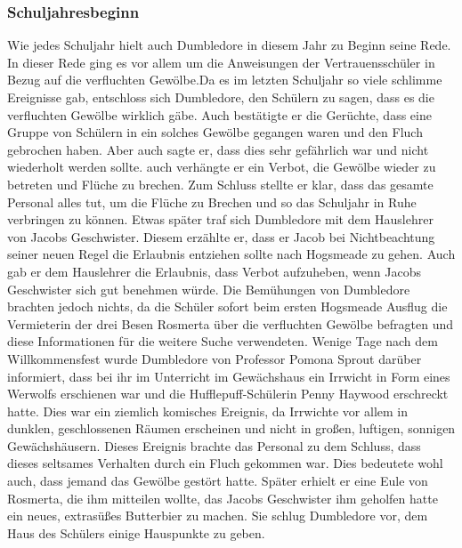 \documentclass[a4paper, 10pt]{article}
\begin{document}
\subsubsection*{Schuljahresbeginn}
Wie jedes Schuljahr hielt auch Dumbledore in diesem Jahr zu Beginn seine Rede. In dieser Rede ging es vor allem um die Anweisungen der Vertrauensschüler in Bezug auf die verfluchten Gewölbe.Da es im letzten Schuljahr so viele schlimme Ereignisse gab, entschloss sich Dumbledore, den Schülern zu sagen, dass es die verfluchten Gewölbe wirklich gäbe. Auch bestätigte er die Gerüchte, dass eine Gruppe von Schülern in ein solches Gewölbe gegangen waren und den Fluch gebrochen haben. Aber auch sagte er, dass dies sehr gefährlich war und nicht wiederholt werden sollte. auch verhängte er ein Verbot, die Gewölbe wieder zu betreten und Flüche zu brechen. Zum Schluss stellte er klar, dass das gesamte Personal alles tut, um die Flüche zu Brechen und so das Schuljahr in Ruhe verbringen zu können.
\vspace{10pt}
\newline
Etwas später traf sich Dumbledore mit dem Hauslehrer von Jacobs Geschwister. Diesem erzählte er, dass er Jacob bei Nichtbeachtung seiner neuen Regel die Erlaubnis entziehen sollte nach Hogsmeade zu gehen. Auch gab er dem Hauslehrer die Erlaubnis, dass Verbot aufzuheben, wenn Jacobs Geschwister sich gut benehmen würde. Die Bemühungen von Dumbledore brachten jedoch nichts, da die Schüler sofort beim ersten Hogsmeade Ausflug die Vermieterin der drei Besen Rosmerta über die verfluchten Gewölbe befragten und diese Informationen für die weitere Suche verwendeten.
\vspace{10pt}
\newline
Wenige Tage nach dem Willkommensfest wurde Dumbledore von Professor Pomona Sprout darüber informiert, dass bei ihr im Unterricht im Gewächshaus ein Irrwicht in Form eines Werwolfs erschienen war und die Hufflepuff-Schülerin Penny Haywood erschreckt hatte. Dies war ein ziemlich komisches Ereignis, da Irrwichte vor allem in dunklen, geschlossenen Räumen erscheinen und nicht in großen, luftigen, sonnigen Gewächshäusern. Dieses Ereignis brachte das Personal zu dem Schluss, dass dieses seltsames Verhalten durch ein Fluch gekommen war. Dies bedeutete wohl auch, dass jemand das Gewölbe gestört hatte. Später erhielt er eine Eule von Rosmerta, die ihm mitteilen wollte, das Jacobs Geschwister ihm geholfen hatte ein neues, extrasüßes Butterbier zu machen. Sie schlug Dumbledore vor, dem Haus des Schülers einige Hauspunkte zu geben.
\end{document}
